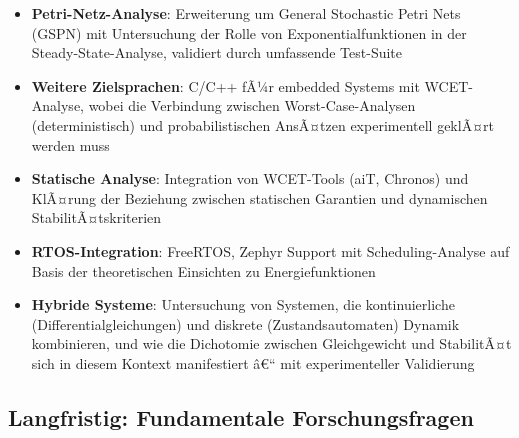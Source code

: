 ﻿\documentclass[a4paper,12pt]{report}
\theoremstyle{definition}
\begin{document}
\begin{itemize}
	\item[-] \textbf{Petri-Netz-Analyse}: Erweiterung um General Stochastic Petri Nets (GSPN) mit Untersuchung der Rolle von Exponentialfunktionen in der Steady-State-Analyse, validiert durch umfassende Test-Suite
	
	\item[-] \textbf{Weitere Zielsprachen}: C/C++ fÃ¼r embedded Systems mit WCET-Analyse, wobei die Verbindung zwischen Worst-Case-Analysen (deterministisch) und probabilistischen AnsÃ¤tzen experimentell geklÃ¤rt werden muss
	
	\item[-] \textbf{Statische Analyse}: Integration von WCET-Tools (aiT, Chronos) und KlÃ¤rung der Beziehung zwischen statischen Garantien und dynamischen StabilitÃ¤tskriterien
	
	\item[-] \textbf{RTOS-Integration}: FreeRTOS, Zephyr Support mit Scheduling-Analyse auf Basis der theoretischen Einsichten zu Energiefunktionen
	
	\item[-] \textbf{Hybride Systeme}: Untersuchung von Systemen, die kontinuierliche (Differentialgleichungen) und diskrete (Zustandsautomaten) Dynamik kombinieren, und wie die Dichotomie zwischen Gleichgewicht und StabilitÃ¤t sich in diesem Kontext manifestiert â€“ mit experimenteller Validierung
\end{itemize}

\subsection{Langfristig: Fundamentale Forschungsfragen}
\end{document}

